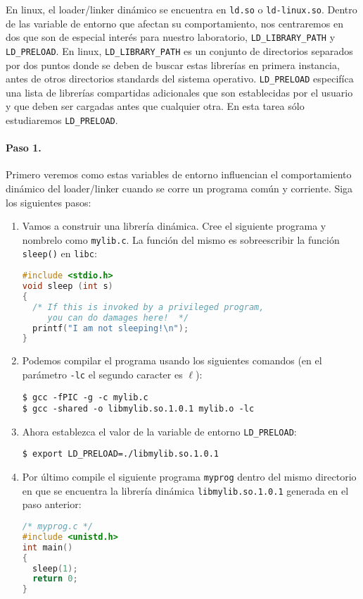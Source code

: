 En linux, el loader/linker dinámico se encuentra en {\tt ld.so} o {\tt ld-linux.so}.
Dentro de las variable de entorno que afectan su comportamiento, nos centraremos en dos que son de especial interés para nuestro laboratorio, {\tt LD\_LIBRARY\_PATH} y {\tt LD\_PRELOAD}.
En linux,  {\tt LD\_LIBRARY\_PATH} es un conjunto de directorios separados por dos puntos donde se deben de buscar estas librerías en primera instancia, antes de otros directorios standards del sistema operativo.
{\tt LD\_PRELOAD} especifíca una lista de librerías compartidas adicionales que son establecidas por el usuario y que deben ser cargadas antes que cualquier otra. En esta tarea sólo estudiaremos {\tt LD\_PRELOAD}.


\paragraph{Paso 1.}
Primero veremos como estas variables de entorno influencian el comportamiento dinámico del loader/linker cuando se corre un programa común y corriente.
Siga los siguientes pasos:


\begin{enumerate}

  \item Vamos a construir una librería dinámica. Cree el siguiente programa y nombrelo como {\tt mylib.c}. La función del mismo es sobreescribir la función {\tt sleep()} en {\tt libc}:

\begin{lstlisting}[language=C]
#include <stdio.h>
void sleep (int s)
{
  /* If this is invoked by a privileged program,
     you can do damages here!  */
  printf("I am not sleeping!\n");
}
\end{lstlisting}

 \item Podemos compilar el programa usando los siguientes comandos (en el parámetro {\tt -lc} el segundo caracter es $\ell$):

\begin{lstlisting}
$ gcc -fPIC -g -c mylib.c
$ gcc -shared -o libmylib.so.1.0.1 mylib.o -lc
\end{lstlisting}



  \item Ahora establezca el valor de la variable de entorno {\tt LD\_PRELOAD}:
\begin{lstlisting}
$ export LD_PRELOAD=./libmylib.so.1.0.1
\end{lstlisting}

 \item Por último compile el siguiente programa {\tt myprog} dentro del mismo directorio en que se encuentra la librería dinámica {\tt libmylib.so.1.0.1} generada en el paso anterior:

\begin{lstlisting}[language=C]
/* myprog.c */
#include <unistd.h>
int main()
{
  sleep(1);
  return 0;
}
\end{lstlisting}
\end{enumerate}


